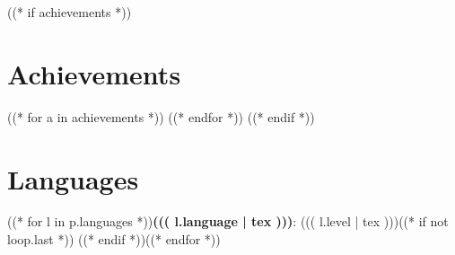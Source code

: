 \documentclass[a4paper,11pt]{article}
\begin{document}
((* if achievements *))
\section{Achievements}
  \resumeItemListStart
((* for a in achievements *))
((* endfor *))
  \resumeItemListEnd
((* endif *))

\section{Languages}
 \begin{itemize}[leftmargin=0.15in, label={}]
    \small{\item{((* for l in p.languages *))\textbf{((( l.language | tex )))}: ((( l.level | tex )))((* if not loop.last *)) \quad ((* endif *))((* endfor *))}}
 \end{itemize}
\end{document}
